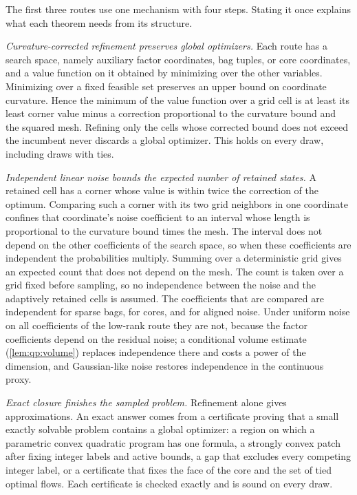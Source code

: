 The first three routes use one mechanism with four steps. Stating it once
explains what each theorem needs from its structure.

\emph{Curvature-corrected refinement preserves global optimizers.} Each route
has a search space, namely auxiliary factor coordinates, bag tuples, or core
coordinates, and a value function on it obtained by minimizing over the other
variables. Minimizing over a fixed feasible set preserves an upper bound on
coordinate curvature. Hence the minimum of the value function over a grid
cell is at least its least corner value minus a correction proportional to
the curvature bound and the squared mesh. Refining only the cells whose
corrected bound does not exceed the incumbent never discards a global
optimizer. This holds on every draw, including draws with ties.

\emph{Independent linear noise bounds the expected number of retained
states.} A retained cell has a corner whose value is within twice the
correction of the optimum. Comparing such a corner with its two grid
neighbors in one coordinate confines that coordinate's noise coefficient to
an interval whose length is proportional to the curvature bound times the
mesh. The interval does not depend on the other coefficients of the search
space, so when these coefficients are independent the probabilities
multiply. Summing over a deterministic grid gives an expected count that
does not depend on the mesh. The count is taken over a grid fixed before
sampling, so no independence between the noise and the adaptively retained
cells is assumed. The coefficients that are compared are independent for
sparse bags, for cores, and for aligned noise. Under uniform noise on all
coefficients of the low-rank route they are not, because the factor
coefficients depend on the residual noise; a conditional volume estimate
(\cref{lem:qp:volume}) replaces independence there and costs a power of
the dimension, and Gaussian-like noise restores independence in the
continuous proxy.

\emph{Exact closure finishes the sampled problem.} Refinement alone gives
approximations. An exact answer comes from a certificate proving that a
small exactly solvable problem contains a global optimizer: a region on
which a parametric convex quadratic program has one formula, a strongly
convex patch after fixing integer labels and active bounds, a gap that
excludes every competing integer label, or a certificate that fixes the face
of the core and the set of tied optimal flows. Each certificate is checked
exactly and is sound on every draw.

